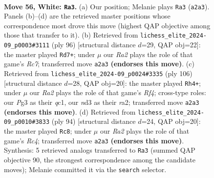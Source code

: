 \documentclass[11pt]{article}
\begin{document}
\clearpage

\begin{figure}[p]\centering
\begin{subfigure}{0.46\textwidth}\centering
\resizebox{\linewidth}{!}{%
\newchessgame
\chessboard[
  setfen={6k1/p7/1p6/5p1q/P1p5/3n2P1/RP4K1/8 w - - 2 56},
  showmover=false,
  pgfstyle=straightmove, color=movearrow, markmove={a2-a3}
]}
\caption{}
\end{subfigure}\hfill
\begin{subfigure}{0.46\textwidth}\centering
\resizebox{\linewidth}{!}{%
\newchessgame
\chessboard[
  setfen={8/2R5/8/p2kp3/1p6/n7/P1P5/2K5 w - - 2 49},
  showmover=false,
  pgfstyle=straightmove, color=movearrow, markmove={c7-d7}
]}
\caption{}
\end{subfigure}
\\[4pt]
\begin{subfigure}{0.46\textwidth}\centering
\resizebox{\linewidth}{!}{%
\newchessgame
\chessboard[
  setfen={7b/p6k/1p6/8/P4R2/4pP1K/r7/2q5 w - - 0 54},
  showmover=false,
  pgfstyle=straightmove, color=movearrow, markmove={f4-h4}
]}
\caption{}
\end{subfigure}\hfill
\begin{subfigure}{0.46\textwidth}\centering
\resizebox{\linewidth}{!}{%
\newchessgame
\chessboard[
  setfen={8/7p/3k2p1/p2n4/P1R2PP1/5K2/8/8 w - - 4 48},
  showmover=false,
  pgfstyle=straightmove, color=movearrow, markmove={c4-c8}
]}
\caption{}
\end{subfigure}
\caption{\textbf{Move 56, White: \texttt{Ra3}.} (a) Our position; Melanie plays \texttt{Ra3} (\texttt{a2a3}). Panels (b)--(d) are the retrieved master positions whose correspondence most drove this move (highest QAP objective among those that transfer to it). (b) Retrieved from \texttt{lichess\_elite\_2024-09\_p0003\#3111} (ply 96) [structural distance $d$=29, QAP obj=22]: the master played \texttt{Rd7+}; under $\mu$ our \emph{Ra2} plays the role of that game's \emph{Rc7}; transferred move \texttt{a2a3} \textbf{(endorses this move)}. (c) Retrieved from \texttt{lichess\_elite\_2024-09\_p0024\#3335} (ply 106) [structural distance $d$=28, QAP obj=20]: the master played \texttt{Rh4+}; under $\mu$ our \emph{Ra2} plays the role of that game's \emph{Rf4}; cross-type roles: our \emph{P}g3 as their \emph{q}c1, our \emph{n}d3 as their \emph{r}a2; transferred move \texttt{a2a3} \textbf{(endorses this move)}. (d) Retrieved from \texttt{lichess\_elite\_2024-09\_p0010\#3833} (ply 94) [structural distance $d$=24, QAP obj=20]: the master played \texttt{Rc8}; under $\mu$ our \emph{Ra2} plays the role of that game's \emph{Rc4}; transferred move \texttt{a2a3} \textbf{(endorses this move)}. Synthesis: 5 retrieved analogs transferred to \texttt{Ra3} (summed QAP objective 90, the strongest correspondence among the candidate moves); Melanie committed it via the \texttt{search} selector.}
\label{fig:thought-m110}
\end{figure}
\end{document}
